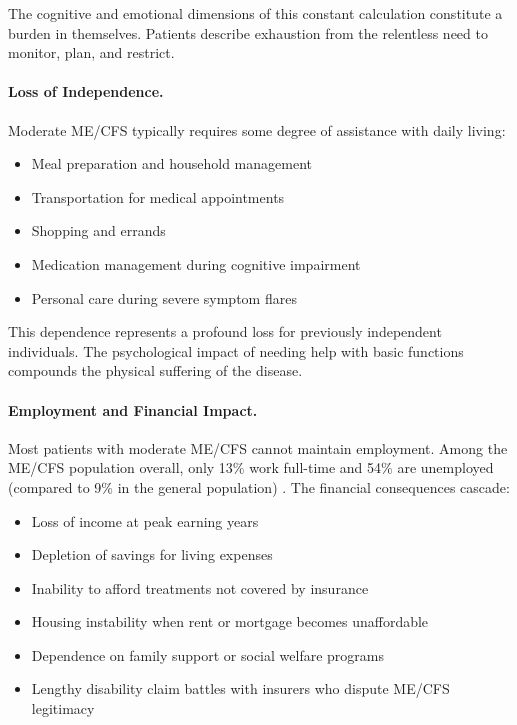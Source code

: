 The cognitive and emotional dimensions of this constant calculation constitute a burden in themselves. Patients describe exhaustion from the relentless need to monitor, plan, and restrict.

\paragraph{Loss of Independence.}
Moderate ME/CFS typically requires some degree of assistance with daily living:
\begin{itemize}
    \item Meal preparation and household management
    \item Transportation for medical appointments
    \item Shopping and errands
    \item Medication management during cognitive impairment
    \item Personal care during severe symptom flares
\end{itemize}

This dependence represents a profound loss for previously independent individuals. The psychological impact of needing help with basic functions compounds the physical suffering of the disease.

\paragraph{Employment and Financial Impact.}
Most patients with moderate ME/CFS cannot maintain employment. Among the ME/CFS population overall, only 13\% work full-time and 54\% are unemployed (compared to 9\% in the general population) \cite{Pendergrast2020housebound}. The financial consequences cascade:
\begin{itemize}
    \item Loss of income at peak earning years
    \item Depletion of savings for living expenses
    \item Inability to afford treatments not covered by insurance
    \item Housing instability when rent or mortgage becomes unaffordable
    \item Dependence on family support or social welfare programs
    \item Lengthy disability claim battles with insurers who dispute ME/CFS legitimacy
\end{itemize}

